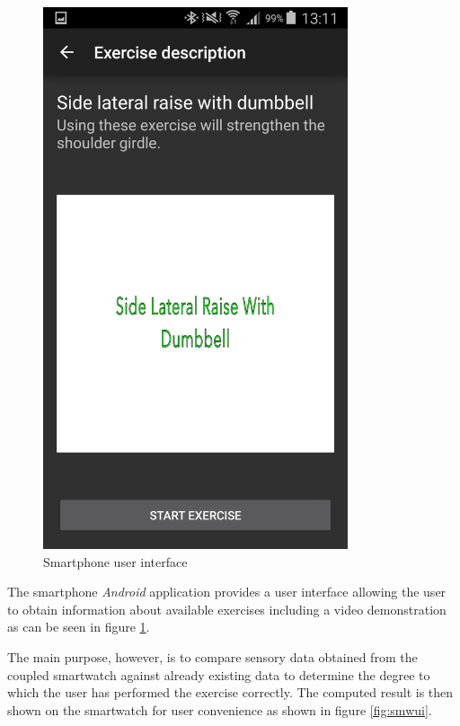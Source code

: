 \begin{figure}[t!]
\begin{minipage}{0.25\textwidth}
        \includegraphics[width=0.80\textwidth]{00_resources/figures/Android_Phone_DescriptionView.png}
    \end{minipage}
  \caption{Smartphone user interface}
  \label{fig:smpui}
\end{figure}

The smartphone \textit{Android} application provides a user interface allowing the user to obtain information about available exercises including a video demonstration as can be seen in figure \ref{fig:smpui}.

The main purpose, however, is to compare sensory data obtained from the coupled smartwatch against already existing data to determine the degree to which the user has performed the exercise correctly. The computed result is then shown on the smartwatch for user convenience as shown in figure \ref{fig:smwui}.


